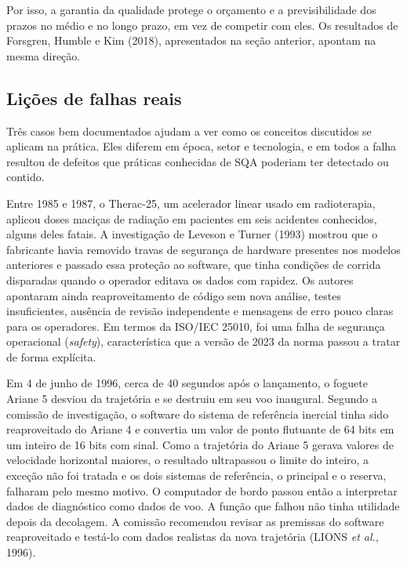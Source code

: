 \documentclass[12pt,a4paper]{article}
\begin{document}
Por isso, a garantia da qualidade protege o orçamento e a previsibilidade dos prazos no médio e no longo prazo, em vez de competir com eles. Os resultados de Forsgren, Humble e Kim (2018), apresentados na seção anterior, apontam na mesma direção.

\subsection{Lições de falhas reais}
\label{sec:casos}

Três casos bem documentados ajudam a ver como os conceitos discutidos se aplicam na prática. Eles diferem em época, setor e tecnologia, e em todos a falha resultou de defeitos que práticas conhecidas de SQA poderiam ter detectado ou contido.

Entre 1985 e 1987, o Therac-25, um acelerador linear usado em radioterapia, aplicou doses maciças de radiação em pacientes em seis acidentes conhecidos, alguns deles fatais. A investigação de Leveson e Turner (1993) mostrou que o fabricante havia removido travas de segurança de hardware presentes nos modelos anteriores e passado essa proteção ao software, que tinha condições de corrida disparadas quando o operador editava os dados com rapidez. Os autores apontaram ainda reaproveitamento de código sem nova análise, testes insuficientes, ausência de revisão independente e mensagens de erro pouco claras para os operadores. Em termos da ISO/IEC 25010, foi uma falha de segurança operacional (\textit{safety}), característica que a versão de 2023 da norma passou a tratar de forma explícita.

Em 4 de junho de 1996, cerca de 40 segundos após o lançamento, o foguete Ariane 5 desviou da trajetória e se destruiu em seu voo inaugural. Segundo a comissão de investigação, o software do sistema de referência inercial tinha sido reaproveitado do Ariane 4 e convertia um valor de ponto flutuante de 64 bits em um inteiro de 16 bits com sinal. Como a trajetória do Ariane 5 gerava valores de velocidade horizontal maiores, o resultado ultrapassou o limite do inteiro, a exceção não foi tratada e os dois sistemas de referência, o principal e o reserva, falharam pelo mesmo motivo. O computador de bordo passou então a interpretar dados de diagnóstico como dados de voo. A função que falhou não tinha utilidade depois da decolagem. A comissão recomendou revisar as premissas do software reaproveitado e testá-lo com dados realistas da nova trajetória (LIONS \textit{et al.}, 1996).
\end{document}
